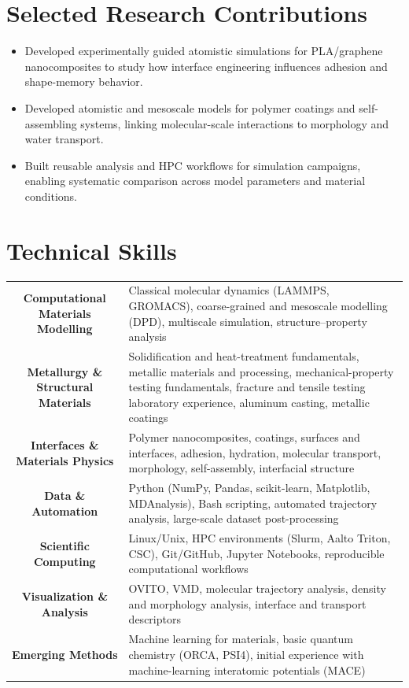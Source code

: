 \documentclass[a4paper,10pt]{article}
\begin{document}
\section{Selected Research Contributions}
\begin{itemize}
    \item Developed experimentally guided atomistic simulations for PLA/graphene nanocomposites to study how interface engineering influences adhesion and shape-memory behavior.
    \item Developed atomistic and mesoscale models for polymer coatings and self-assembling systems, linking molecular-scale interactions to morphology and water transport.
    \item Built reusable analysis and HPC workflows for simulation campaigns, enabling systematic comparison across model parameters and material conditions.
\end{itemize}


\section{Technical Skills}
\begin{tabularx}{\linewidth}{@{}S Y@{}}

\textbf{Computational Materials Modelling} &
Classical molecular dynamics (LAMMPS, GROMACS), coarse-grained and mesoscale modelling (DPD), multiscale simulation, structure--property analysis \\[2pt]

\textbf{Metallurgy \& Structural Materials} &
Solidification and heat-treatment fundamentals, metallic materials and processing, mechanical-property testing fundamentals, fracture and tensile testing laboratory experience, aluminum casting, metallic coatings \\[2pt]

\textbf{Interfaces \& Materials Physics} &
Polymer nanocomposites, coatings, surfaces and interfaces, adhesion, hydration, molecular transport, morphology, self-assembly, interfacial structure \\[2pt]

\textbf{Data \& Automation} &
Python (NumPy, Pandas, scikit-learn, Matplotlib, MDAnalysis), Bash scripting, automated trajectory analysis, large-scale dataset post-processing \\[2pt]

\textbf{Scientific Computing} &
Linux/Unix, HPC environments (Slurm, Aalto Triton, CSC), Git/GitHub, Jupyter Notebooks, reproducible computational workflows \\[2pt]

\textbf{Visualization \& Analysis} &
OVITO, VMD, molecular trajectory analysis, density and morphology analysis, interface and transport descriptors \\[2pt]

\textbf{Emerging Methods} &
Machine learning for materials, basic quantum chemistry (ORCA, PSI4), initial experience with machine-learning interatomic potentials (MACE) \\

\end{tabularx}
\end{document}
